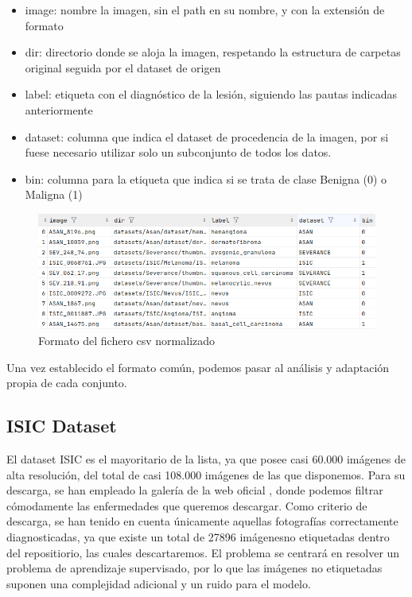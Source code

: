 \begin{itemize}
	\item image: nombre la imagen, sin el path en su nombre, y con la extensión de formato
	\item dir: directorio donde se aloja la imagen, respetando la estructura de carpetas original seguida por el dataset de origen
	\item label: etiqueta con el diagnóstico de la lesión, siguiendo las pautas indicadas anteriormente
	\item dataset: columna que indica el dataset de procedencia de la imagen, por si fuese necesario utilizar solo un subconjunto de todos los datos.
	\item bin: columna para la etiqueta que indica si se trata de clase Benigna (0) o Maligna (1)
\end{itemize}

\begin{figure}[H]
	\centering
	\label {formatocsv}
	\includegraphics[scale = 0.55]{imagenes/formatocsv.png}
	\caption{Formato del fichero csv normalizado}
\end{figure}

Una vez establecido el formato común, podemos pasar al análisis y adaptación propia de cada conjunto.

\subsection{ISIC Dataset}

El dataset ISIC es el mayoritario de la lista, ya que posee casi 60.000 imágenes de alta resolución, del total de casi 108.000 imágenes de las que disponemos. Para su descarga, se han empleado la galería de la web oficial \cite{isicarchive}, donde podemos filtrar cómodamente las enfermedades que queremos descargar. Como criterio de descarga, se han tenido en cuenta únicamente aquellas fotografías correctamente diagnosticadas, ya que existe un total de 27896 imágenesno etiquetadas dentro del repositiorio, las cuales descartaremos. El problema se centrará en resolver un problema de aprendizaje supervisado, por lo que las imágenes no etiquetadas suponen una complejidad adicional y un ruido para el modelo.

